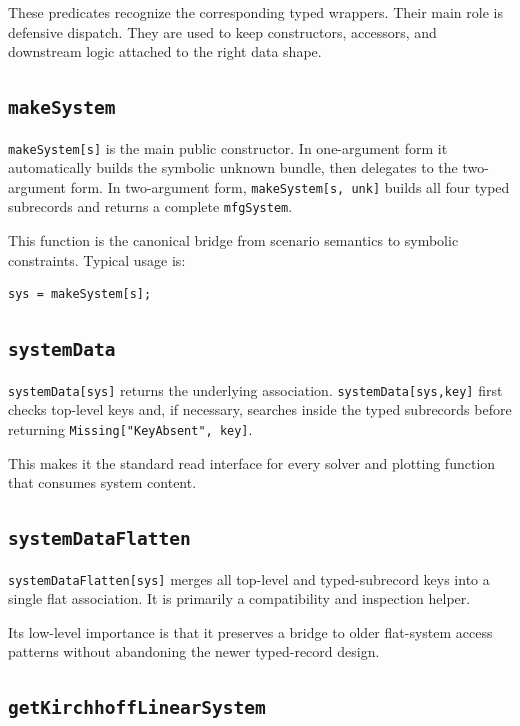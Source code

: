 \documentclass[11pt]{article}
\begin{document}
These predicates recognize the corresponding typed wrappers. Their main role is defensive dispatch. They are used to keep constructors, accessors, and downstream logic attached to the right data shape.

\subsection*{\texttt{makeSystem}}

\texttt{makeSystem[s]} is the main public constructor. In one-argument form it automatically builds the symbolic unknown bundle, then delegates to the two-argument form. In two-argument form, \texttt{makeSystem[s, unk]} builds all four typed subrecords and returns a complete \texttt{mfgSystem}.

This function is the canonical bridge from scenario semantics to symbolic constraints. Typical usage is:

\begin{verbatim}
sys = makeSystem[s];
\end{verbatim}

\subsection*{\texttt{systemData}}

\texttt{systemData[sys]} returns the underlying association. \texttt{systemData[sys,key]} first checks top-level keys and, if necessary, searches inside the typed subrecords before returning \texttt{Missing["KeyAbsent", key]}.

This makes it the standard read interface for every solver and plotting function that consumes system content.

\subsection*{\texttt{systemDataFlatten}}

\texttt{systemDataFlatten[sys]} merges all top-level and typed-subrecord keys into a single flat association. It is primarily a compatibility and inspection helper.

Its low-level importance is that it preserves a bridge to older flat-system access patterns without abandoning the newer typed-record design.

\subsection*{\texttt{getKirchhoffLinearSystem}}
\end{document}
